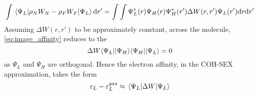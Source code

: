 \begin{solution}
\begin{equation}\label{eq:image_affinity}
    \int \mel{\Psi_L}{\rho_N W_{N} - \rho_F W_{F}}{\Psi_L}\mathrm{d}r' = \int\int \Psi^{*}_L(r)\Psi_H(r)\Psi^{*}_H(r')\Delta W(r,r')\Psi_L(r')\mathrm{d}r\mathrm{d}r'
\end{equation}
Assuming $\Delta W(r,r')$ to be approximately constant, across the molecule, \eqref{eq:image_affinity} reduces to the
\begin{equation}
    \Delta W \langle \Psi_L ||\Psi_H\rangle\langle \Psi_H ||\Psi_L\rangle = 0
\end{equation}
as $\Psi_L$ and $\Psi_H$ are orthogonal. Hence the electron affinity, in the COH-SEX approximation, takes the form
\begin{equation}
    \varepsilon_L - \varepsilon_L^{gas} \approx \mel{\Psi_L}{\Delta W}{\Psi_L}
\end{equation}
\end{solution}

